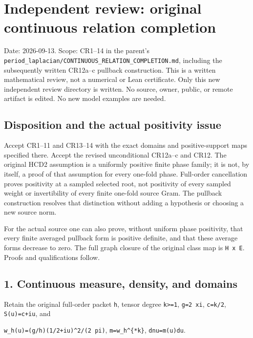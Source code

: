 \section{Independent review: original continuous relation completion}\label{independent-review-original-continuous-relation-completion}

Date: 2026-09-13. Scope: CR1--14 in the parent's \texttt{period\_laplacian/CONTINUOUS\_RELATION\_COMPLETION.md}, including the subsequently written CR12a--c pullback construction. This is a written mathematical review, not a numerical or Lean certificate. Only this new independent review directory is written. No source, owner, public, or remote artifact is edited. No new model examples are needed.

\subsection{Disposition and the actual positivity issue}\label{disposition-and-the-actual-positivity-issue}

Accept CR1--11 and CR13--14 with the exact domains and positive-support maps specified there. Accept the revised unconditional CR12a--c and CR12. The original HCD2 assumption is a uniformly positive finite phase family; it is not, by itself, a proof of that assumption for every one-fold phase. Full-order cancellation proves positivity at a sampled selected root, not positivity of every sampled weight or invertibility of every finite one-fold source Gram. The pullback construction resolves that distinction without adding a hypothesis or choosing a new source norm.

For the actual source one can also prove, without uniform phase positivity, that every finite averaged pullback form is positive definite, and that these average forms decrease to zero. The full graph closure of the original class map is \texttt{H\ x\ E}. Proofs and qualifications follow.

\subsection{1. Continuous measure, density, and domains}\label{continuous-measure-density-and-domains}

Retain the original full-order packet \texttt{h}, tensor degree \texttt{k\textgreater{}=1}, \texttt{g=2\ xi}, \texttt{c=k/2}, \texttt{S(u)=c+iu}, and

\texttt{w\_h(u)=\textbar{}(g/h)(1/2+iu)\textbar{}\^{}2/(2\ pi)}, \texttt{m=w\_h\^{}\{*k\}}, \texttt{dnu=m(u)du}.

